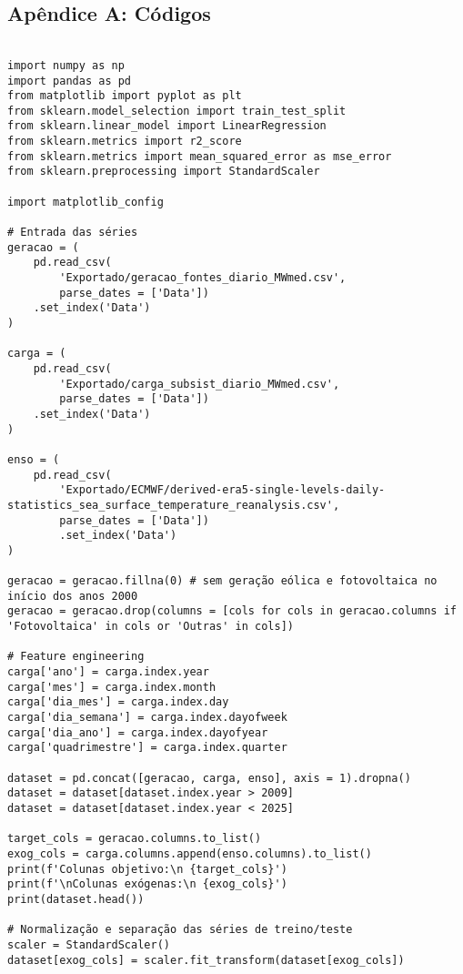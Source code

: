 \begin{apendicesenv}

\chapter*{Apêndice A: Códigos}
\begin{verbatim}

import numpy as np
import pandas as pd
from matplotlib import pyplot as plt
from sklearn.model_selection import train_test_split
from sklearn.linear_model import LinearRegression
from sklearn.metrics import r2_score
from sklearn.metrics import mean_squared_error as mse_error
from sklearn.preprocessing import StandardScaler

import matplotlib_config

# Entrada das séries
geracao = (
    pd.read_csv(
        'Exportado/geracao_fontes_diario_MWmed.csv', 
        parse_dates = ['Data'])
    .set_index('Data')
)

carga = (
    pd.read_csv(
        'Exportado/carga_subsist_diario_MWmed.csv', 
        parse_dates = ['Data'])
    .set_index('Data')
)

enso = (
    pd.read_csv(
        'Exportado/ECMWF/derived-era5-single-levels-daily-statistics_sea_surface_temperature_reanalysis.csv', 
        parse_dates = ['Data'])
        .set_index('Data')
)

geracao = geracao.fillna(0) # sem geração eólica e fotovoltaica no início dos anos 2000
geracao = geracao.drop(columns = [cols for cols in geracao.columns if 'Fotovoltaica' in cols or 'Outras' in cols]) 

# Feature engineering
carga['ano'] = carga.index.year
carga['mes'] = carga.index.month
carga['dia_mes'] = carga.index.day
carga['dia_semana'] = carga.index.dayofweek
carga['dia_ano'] = carga.index.dayofyear
carga['quadrimestre'] = carga.index.quarter

dataset = pd.concat([geracao, carga, enso], axis = 1).dropna()
dataset = dataset[dataset.index.year > 2009]
dataset = dataset[dataset.index.year < 2025]

target_cols = geracao.columns.to_list()
exog_cols = carga.columns.append(enso.columns).to_list()
print(f'Colunas objetivo:\n {target_cols}')
print(f'\nColunas exógenas:\n {exog_cols}')
print(dataset.head())

# Normalização e separação das séries de treino/teste
scaler = StandardScaler()
dataset[exog_cols] = scaler.fit_transform(dataset[exog_cols])


\end{verbatim}
\end{apendicesenv}
